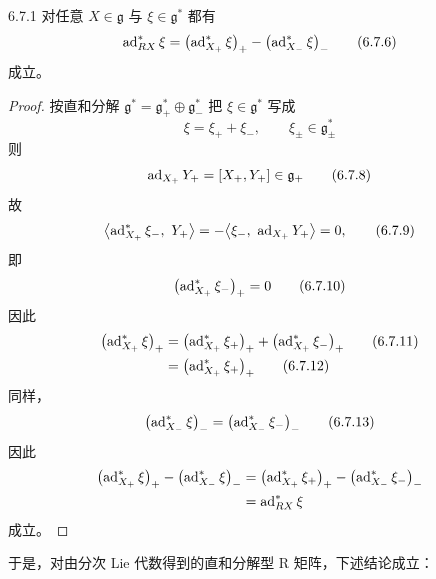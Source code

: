 
\begin{lemma*}{6.7.1}
  对任意 $X\in\mathfrak{g}$ 与 $\xi\in\mathfrak{g}^*$ 都有
  \begin{equation}
    \operatorname{ad}^*_{RX}\xi = \bigl(\operatorname{ad}^*_{X_+}\xi\bigr)_+ - \bigl(\operatorname{ad}^*_{X_-}\xi\bigr)_-
    \tag{6.7.6}
  \end{equation}
  成立。
\end{lemma*}

\begin{proof}
  按直和分解 $\mathfrak{g}^*=\mathfrak{g}^*_+\oplus\mathfrak{g}^*_-$ 把 $\xi\in\mathfrak{g}^*$ 写成
  \begin{equation}
    \xi = \xi_+ + \xi_-,\qquad \xi_\pm\in\mathfrak{g}^*_\pm
    \tag{6.7.7}
  \end{equation}
  则
  \begin{equation}
    \operatorname{ad}_{X_+}Y_+ = [X_+,Y_+]\in\mathfrak{g}_+
    \tag{6.7.8}
  \end{equation}
  故
  \begin{equation}
    \bigl\langle \operatorname{ad}^*_{X_+}\xi_-,\ Y_+\bigr\rangle
    = -\bigl\langle \xi_-,\ \operatorname{ad}_{X_+}Y_+\bigr\rangle
    = 0,
    \tag{6.7.9}
  \end{equation}
  即
  \begin{equation}
    \bigl(\operatorname{ad}^*_{X_+}\xi_-\bigr)_+ = 0
    \tag{6.7.10}
  \end{equation}
  因此
  \begin{align}
    \bigl(\operatorname{ad}^*_{X_+}\xi\bigr)_+
      &= \bigl(\operatorname{ad}^*_{X_+}\xi_+\bigr)_+ + \bigl(\operatorname{ad}^*_{X_+}\xi_-\bigr)_+ \tag{6.7.11}\\
      &= \bigl(\operatorname{ad}^*_{X_+}\xi_+\bigr)_+ \tag{6.7.12}
  \end{align}
  同样，
  \begin{equation}
    \bigl(\operatorname{ad}^*_{X_-}\xi\bigr)_- = \bigl(\operatorname{ad}^*_{X_-}\xi_-\bigr)_-
    \tag{6.7.13}
  \end{equation}
  因此
  \[
  \begin{aligned}
    \bigl(\operatorname{ad}^*_{X_+}\xi\bigr)_+ - \bigl(\operatorname{ad}^*_{X_-}\xi\bigr)_-
      &= \bigl(\operatorname{ad}^*_{X_+}\xi_+\bigr)_+ - \bigl(\operatorname{ad}^*_{X_-}\xi_-\bigr)_- \\
      &= \operatorname{ad}^*_{RX}\xi
  \end{aligned}
  \]
  成立。
\end{proof}

于是，对由分次 Lie 代数得到的直和分解型 R 矩阵，下述结论成立：

